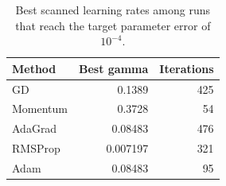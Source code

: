 \begin{table}[htbp]
    \centering
    \caption{Best scanned learning rates among runs that reach the target parameter error of $10^{-4}$.}
    \label{tab:optimizer-learning-rates}
    \begin{tabular}{lrr}
        \hline\hline
        Method   & Best gamma & Iterations \\
        \hline
        GD       & 0.1389     & 425        \\
        Momentum & 0.3728     & 54         \\
        AdaGrad  & 0.08483    & 476        \\
        RMSProp  & 0.007197   & 321        \\
        Adam     & 0.08483    & 95         \\
        \hline\hline
    \end{tabular}
\end{table}
